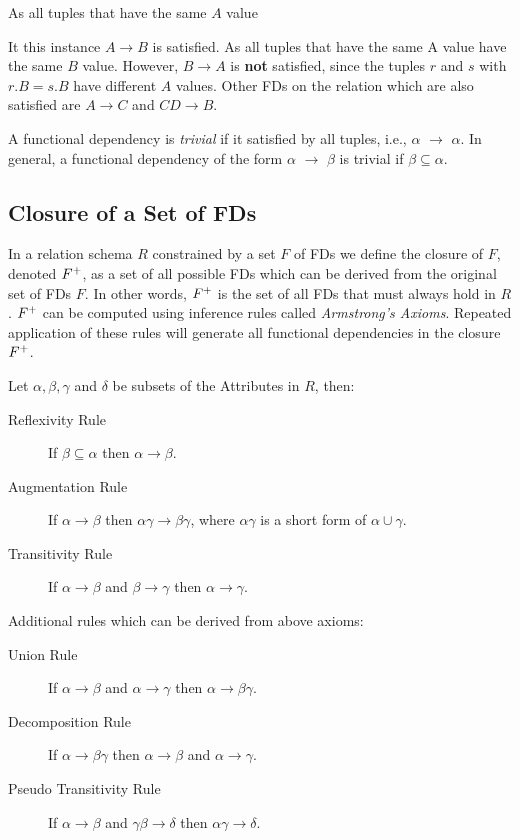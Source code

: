 As all tuples that have the same $A$ value

It this instance $A \rightarrow B$  is satisfied.
As all tuples that have the same A value have the same $B$ value. However,
$B \rightarrow A$ is \textbf{not} satisfied, since the tuples $r$ and $s$ with $r.B = s.B$ have
different $A$ values. Other FDs on the relation which are also satisfied are
$A \rightarrow C$ and $CD \rightarrow B$.

A functional dependency is \textit{trivial} if it satisfied by all tuples, i.e., $\alpha$ $\rightarrow$ $\alpha$.
In general, a functional dependency of the form $\alpha$ $\rightarrow$ $\beta$ is trivial if 
$\beta \subseteq \alpha$.

\subsection{Closure of a Set of FDs}
In a relation schema $R$ constrained by a set $F$ of FDs we define the closure of $F$, denoted $F\sp{+}$,
as a set of all possible FDs which can be derived from the original set of FDs $F$. In 
other words, $F\sp{+}$ is the set of all FDs that must always hold in $R$. $F\sp{+}$ can be
computed using inference rules called \textit{Armstrong's Axioms}. 
Repeated application of these rules will generate all functional dependencies in the closure $F\sp{+}$.

Let $\alpha, \beta, \gamma$ and $\delta$ be subsets of the Attributes in $R$, then:

\begin{description}
  \item[Reflexivity Rule] If $\beta \subseteq \alpha$ then $\alpha \rightarrow \beta$.
  \item[Augmentation Rule] If $\alpha \rightarrow \beta$ then $\alpha\gamma \rightarrow \beta\gamma$, where $\alpha\gamma$ is a short form of $\alpha \cup \gamma$.
  \item[Transitivity Rule] If $\alpha \rightarrow \beta$ and $\beta \rightarrow \gamma$ then $\alpha \rightarrow \gamma$.
\end{description}

\noindent Additional rules which can be derived from above axioms:

\begin{description}
  \item[Union Rule] If $\alpha \rightarrow \beta$ and $\alpha \rightarrow \gamma$ then $\alpha \rightarrow \beta\gamma$.
  \item[Decomposition Rule] If $\alpha \rightarrow \beta\gamma$ then $\alpha \rightarrow \beta$ and $\alpha \rightarrow \gamma$.
  \item[Pseudo Transitivity Rule] If $\alpha \rightarrow \beta$ and $\gamma\beta \rightarrow \delta$ then $\alpha\gamma \rightarrow \delta$.
\end{description}

